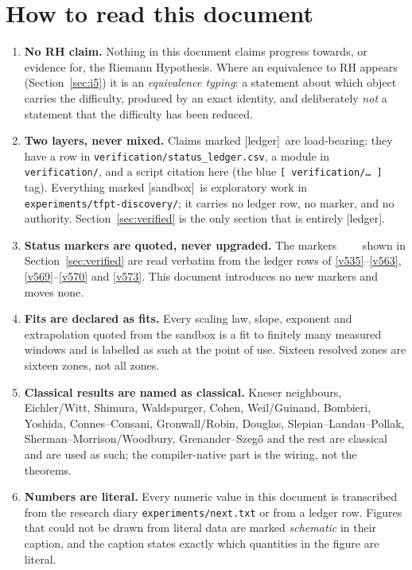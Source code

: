 \documentclass[11pt,a4paper]{article}
\newcommand{\sbx}{{\small\textcolor{tfgray}{\textsf{[sandbox]}}}}
\newcommand{\ver}{{\small\textcolor{tfgreen!60!black}{\textsf{[ledger]}}}}
\begin{document}
\section{How to read this document}
\begin{gapboxnb}
\begin{enumerate}[leftmargin=1.4em,label=\textbf{\arabic*.}]
\item \textbf{No RH claim.} Nothing in this document claims progress towards, or evidence for, the
Riemann Hypothesis. Where an equivalence to RH appears (Section~\ref{sec:i5}) it is an
\emph{equivalence typing}: a statement about which object carries the difficulty, produced by an exact
identity, and deliberately \emph{not} a statement that the difficulty has been reduced.
\item \textbf{Two layers, never mixed.} Claims marked \ver\ are load-bearing: they have a row in
\texttt{verification/status\_ledger.csv}, a module in \texttt{verification/}, and a script citation
here (the blue \texttt{[\,verification/\dots\,]} tag). Everything marked \sbx\ is exploratory work in \texttt{experiments/tfpt-discovery/}; it carries
no ledger row, no marker, and no authority. Section~\ref{sec:verified} is the only section that is
entirely \ver.
\item \textbf{Status markers are quoted, never upgraded.} The markers \mE\ \mC\ \mO\ \mX\ shown in
Section~\ref{sec:verified} are read verbatim from the ledger rows of \vref{v535}--\vref{v563}, \vref{v569}--\vref{v570} and \vref{v573}. This
document introduces no new markers and moves none.
\item \textbf{Fits are declared as fits.} Every scaling law, slope, exponent and extrapolation quoted
from the sandbox is a fit to finitely many measured windows and is labelled as such at the point of
use. Sixteen resolved zones are sixteen zones, not all zones.
\item \textbf{Classical results are named as classical.} Kneser neighbours, Eichler/Witt, Shimura,
Waldspurger, Cohen, Weil/Guinand, Bombieri, Yoshida, Connes--Consani, Gronwall/Robin, Douglas,
Slepian--Landau--Pollak, Sherman--Morrison/Woodbury, Grenander--Szeg\H{o} and the rest are classical
and are used as such; the compiler-native part is the wiring, not the theorems.
\item \textbf{Numbers are literal.} Every numeric value in this document is transcribed from the
research diary \texttt{experiments/next.txt} or from a ledger row. Figures that could not be drawn
from literal data are marked \emph{schematic} in their caption, and the caption states exactly which
quantities in the figure are literal.
\end{enumerate}
\end{gapboxnb}
\end{document}
